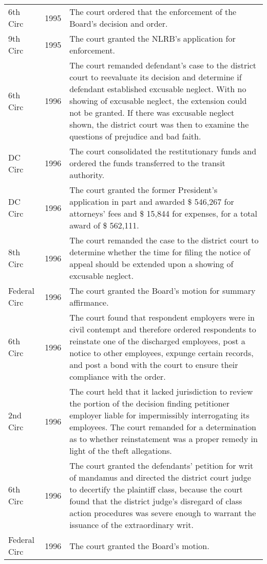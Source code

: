 \documentclass[10pt, letterpaper]{article}
\begin{document}
\begin{spacing}{1.0}
\begin{small}
\begin{longtable}[H]{llp{5in}}
    6th Circ & 1995 & The court ordered that the enforcement of the Board's decision and order.\\[4pt]
    9th Circ & 1995 & The court granted the NLRB's application for enforcement.\\[4pt]
    6th Circ & 1996 & The court remanded defendant's case to the district court to reevaluate its decision and determine if defendant established excusable neglect. With no showing of excusable neglect, the extension could not be granted. If there was excusable neglect shown, the district court was then to examine the questions of prejudice and bad faith.\\[4pt]
    DC Circ & 1996 & The court consolidated the restitutionary funds and ordered the funds transferred to the transit authority.\\[4pt]
    DC Circ & 1996 & The court granted the former President's application in part and awarded \$ 546,267 for attorneys' fees and \$ 15,844 for expenses, for a total award of \$ 562,111.\\[4pt]
    8th Circ & 1996 & The court remanded the case to the district court to determine whether the time for filing the notice of appeal should be extended upon a showing of excusable neglect.\\[4pt]
    Federal Circ & 1996 & The court granted the Board's motion for summary affirmance.\\[4pt]
    6th Circ & 1996 & The court found that respondent employers were in civil contempt and therefore ordered respondents to reinstate one of the discharged employees, post a notice to other employees, expunge certain records, and post a bond with the court to ensure their compliance with the order.\\[4pt]
    2nd Circ & 1996 & The court held that it lacked jurisdiction to review the portion of the decision finding petitioner employer liable for impermissibly interrogating its employees. The court remanded for a determination as to whether reinstatement was a proper remedy in light of the theft allegations.\\[4pt]
    6th Circ & 1996 & The court granted the defendants' petition for writ of mandamus and directed the district court judge to decertify the plaintiff class, because the court found that the district judge's disregard of class action procedures was severe enough to warrant the issuance of the extraordinary writ.\\[4pt]
    Federal Circ & 1996 & The court granted the Board's motion.\\[4pt]

\end{longtable}
\end{small}
\end{spacing}
\end{document}
